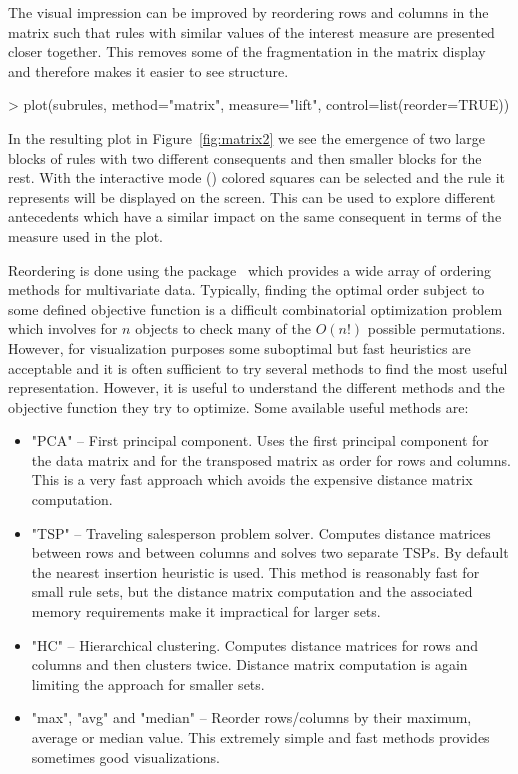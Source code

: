 \documentclass[nojss]{jss}
\begin{document}
The visual impression can be improved by
reordering rows and columns in the matrix
such that rules with similar values of the interest measure are presented
closer together.
This removes some of the fragmentation in the
matrix display and therefore makes it easier to see structure.

\begin{Schunk}
\begin{Sinput}
> plot(subrules, method="matrix", measure="lift", control=list(reorder=TRUE))
\end{Sinput}
\end{Schunk}

In the resulting plot in Figure~\ref{fig:matrix2} we
see the emergence of two large
blocks of rules with two different consequents and then smaller blocks
for the rest. With the interactive mode ()
colored squares can be selected
and the rule it represents will be displayed on the screen.
This can
be used to explore different antecedents which have a similar impact on
the same consequent in terms of the measure used in the plot.

Reordering is done using the 
package~\citep{arulesViz:Hahsler:2008} which provides a wide array of
ordering methods for multivariate data. Typically, finding the optimal
order subject to some defined objective function
is a difficult combinatorial optimization problem which involves
for $n$ objects to check many of the $O(n!)$ possible permutations.
However, for visualization purposes
some suboptimal but fast heuristics are acceptable and it is
often sufficient to try several methods to find the most useful representation.
However, it is useful to understand the different methods
and the objective function they try to optimize.
Some available useful methods are:
\begin{itemize}
\item "PCA" -- First principal component. Uses the first principal component
for the data matrix and for the transposed matrix as order for
    rows and columns. This is a very fast approach which avoids the expensive
    distance matrix computation.

\item "TSP" -- Traveling salesperson problem solver. Computes distance matrices
    between rows and between columns and solves two separate TSPs. By default
    the nearest insertion heuristic is used. This method is reasonably fast for
    small rule sets, but the distance matrix computation and the associated
    memory requirements make it impractical for larger sets.

\item "HC" -- Hierarchical clustering. Computes distance matrices
    for rows and columns and
    then clusters twice. Distance matrix computation is again limiting
    the approach for smaller sets.

\item "max", "avg" and "median" -- Reorder rows/columns by their maximum,
    average or median value. This extremely simple and fast methods
    provides sometimes good visualizations.
\end{itemize}
\end{document}
